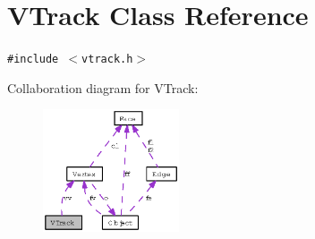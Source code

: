 \section{VTrack Class Reference}
\label{classVTrack}
{\tt \#include $<$vtrack.h$>$}

Collaboration diagram for VTrack:\begin{figure}[H]
\begin{center}
\leavevmode
\includegraphics[width=114pt]{classVTrack__coll__graph}
\end{center}
\end{figure}
